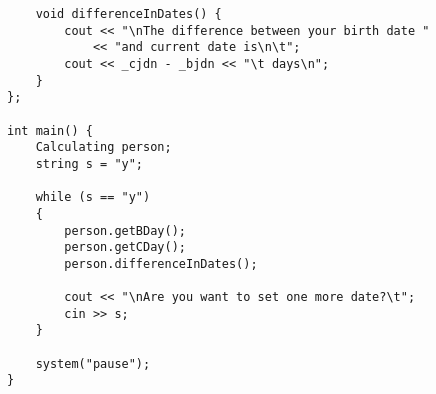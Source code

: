 \begin{lstlisting}
	void differenceInDates() {
		cout << "\nThe difference between your birth date "
			<< "and current date is\n\t";
		cout << _cjdn - _bjdn << "\t days\n";
	}
};

int main() {
	Calculating person;
	string s = "y";

	while (s == "y")
	{
		person.getBDay();
		person.getCDay();
		person.differenceInDates();

		cout << "\nAre you want to set one more date?\t";
		cin >> s;
	}

	system("pause");
}
\end{lstlisting}

